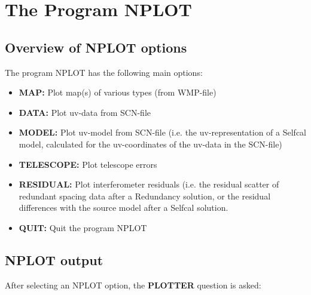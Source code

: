 % 
% 
%
%
\chapter{The Program NPLOT} 

\tableofcontents  


\section{Overview of NPLOT options} 
\label{.options} 

The program NPLOT has the following main options: 

\begin{itemize} 
\item {\bf MAP:}        Plot map(s) of various types (from WMP-file) 
\item {\bf DATA:}       Plot uv-data from SCN-file 
\item {\bf MODEL:}      Plot uv-model from SCN-file  
        (i.e. the uv-representation of a Selfcal model,  
        calculated for the uv-coordinates of the uv-data in the SCN-file) 
\item {\bf TELESCOPE:}  Plot telescope errors 
\item {\bf RESIDUAL:}   Plot interferometer residuals 
        (i.e. the residual scatter of redundant spacing data after a 
        Redundancy solution, or the residual differences with the  
        source model after a Selfcal solution. 
\item {\bf QUIT:}       Quit the program NPLOT 
\end{itemize} 

\section{NPLOT output} 
\label{.output} 

After selecting an NPLOT option, the {\bf PLOTTER} question is asked: 

